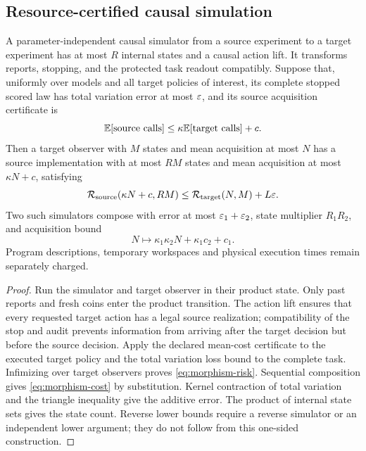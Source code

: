 \subsection{Resource-certified causal simulation}
\begin{proposition}\label{prop:morphism}
A parameter-independent causal simulator from a source experiment to a target experiment has at most $R$ internal states and a causal action lift. It transforms reports, stopping, and the protected task readout compatibly. Suppose that, uniformly over models and all target policies of interest, its complete stopped scored law has total variation error at most $\varepsilon$, and its source acquisition certificate is
\[
 \mathbb E[\text{source calls}]\le\kappa\mathbb E[\text{target calls}]+c.
\]
Then a target observer with $M$ states and mean acquisition at most $N$ has a source implementation with at most $RM$ states and mean acquisition at most $\kappa N+c$, satisfying
\begin{equation}\label{eq:morphism-risk}
 \mathcal R_{\rm source}(\kappa N+c,RM)
       \le\mathcal R_{\rm target}(N,M)+L\varepsilon.
\end{equation}
Two such simulators compose with error at most $\varepsilon_1+\varepsilon_2$, state multiplier $R_1R_2$, and acquisition bound
\begin{equation}\label{eq:morphism-cost}
 N\longmapsto\kappa_1\kappa_2N+\kappa_1c_2+c_1.
\end{equation}
Program descriptions, temporary workspaces and physical execution times remain separately charged.
\end{proposition}
\begin{proof}
Run the simulator and target observer in their product state. Only past reports and fresh coins enter the product transition. The action lift ensures that every requested target action has a legal source realization; compatibility of the stop and audit prevents information from arriving after the target decision but before the source decision. Apply the declared mean-cost certificate to the executed target policy and the total variation loss bound to the complete task. Infimizing over target observers proves \eqref{eq:morphism-risk}. Sequential composition gives \eqref{eq:morphism-cost} by substitution. Kernel contraction of total variation and the triangle inequality give the additive error. The product of internal state sets gives the state count. Reverse lower bounds require a reverse simulator or an independent lower argument; they do not follow from this one-sided construction.
\end{proof}

